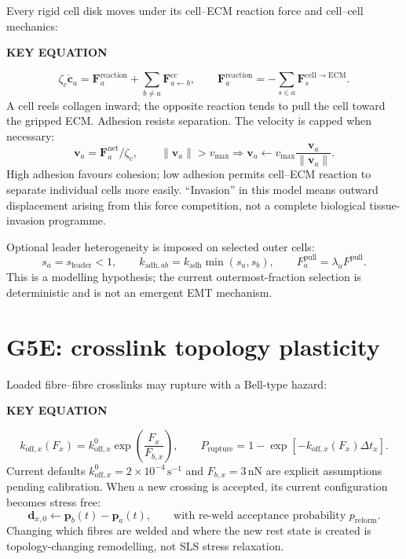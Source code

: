 \documentclass[10.5pt]{article}
\newcommand{\cv}{\mathbf c}
\newcommand{\Fv}{\mathbf F}
\newcommand{\keylabel}{\par\smallskip\noindent\textcolor{g5}{\textbf{KEY EQUATION}}\par\vspace{-5pt}}
\newcommand{\unit}[1]{\,\mathrm{#1}}
\begin{document}
Every rigid cell disk moves under its cell--ECM reaction force and cell--cell mechanics:
\keylabel
\begin{equation}
 \zeta_c\dot{\cv}_a=
 \Fv_a^{\mathrm{reaction}}+
 \sum_{b\ne a}\Fv_{a\leftarrow b}^{cc},
 \qquad
 \Fv_a^{\mathrm{reaction}}=-\sum_{s\in a}\Fv_s^{\mathrm{cell\to ECM}}.
 \label{eq:cellmotion}
\end{equation}
A cell reels collagen inward; the opposite reaction tends to pull the cell toward the gripped
ECM. Adhesion resists separation. The velocity is capped when necessary:
\begin{equation}
 \mathbf v_a=\Fv_a^{\mathrm{net}}/\zeta_c,\qquad
 \lVert\mathbf v_a\rVert>v_{\max}\Rightarrow
 \mathbf v_a\leftarrow v_{\max}\frac{\mathbf v_a}{\lVert\mathbf v_a\rVert}.
 \label{eq:speedcap}
\end{equation}
High adhesion favours cohesion; low adhesion permits cell--ECM reaction to separate individual
cells more easily. ``Invasion'' in this model means outward displacement arising from this
force competition, not a complete biological tissue-invasion programme.

Optional leader heterogeneity is imposed on selected outer cells:
\begin{equation}
 s_a=s_{\mathrm{leader}}<1,\qquad
 k_{\mathrm{adh},ab}=k_{\mathrm{adh}}\min(s_a,s_b),\qquad
 F_a^{\mathrm{pull}}=\lambda_aF^{\mathrm{pull}}.
 \label{eq:leader}
\end{equation}
This is a modelling hypothesis; the current outermost-fraction selection is deterministic and is
not an emergent EMT mechanism.

\section{G5E: crosslink topology plasticity}

Loaded fibre--fibre crosslinks may rupture with a Bell-type hazard:
\keylabel
\begin{equation}
 k_{\mathrm{off},x}(F_x)=k_{\mathrm{off},x}^0
 \exp\!\left(\frac{F_x}{F_{b,x}}\right),
 \qquad
 P_{\mathrm{rupture}}=1-
 \exp[-k_{\mathrm{off},x}(F_x)\Delta t_x].
 \label{eq:xrupture}
\end{equation}
Current defaults $k_{\mathrm{off},x}^0=2\times10^{-4}\unit{s^{-1}}$ and
$F_{b,x}=3\unit{nN}$ are explicit assumptions pending calibration. When a new crossing is
accepted, its current configuration becomes stress free:
\begin{equation}
 \mathbf d_{x,0}\leftarrow\mathbf p_b(t)-\mathbf p_a(t),
 \qquad\text{with re-weld acceptance probability }p_{\mathrm{reform}}.
 \label{eq:reweld}
\end{equation}
Changing which fibres are welded and where the new rest state is created is topology-changing
remodelling, not SLS stress relaxation.
\end{document}
